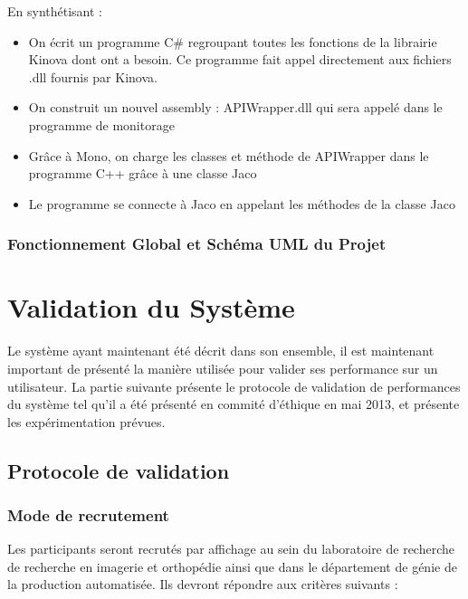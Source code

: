 \documentclass[letterpaper, twoside, 12pt, memoire, creativecommons, hyperref]{thETS}
\begin{document}
En synthétisant :
\begin{itemize}
 \item On écrit un programme C\# regroupant toutes les fonctions de la librairie Kinova dont ont a besoin. Ce programme fait appel directement aux fichiers .dll fournis par Kinova. 
 \item On construit un nouvel assembly : APIWrapper.dll qui sera appelé dans le programme de monitorage
 \item Grâce à Mono, on charge les classes et méthode de APIWrapper dans le programme C++ grâce à une classe Jaco
 \item Le programme se connecte à Jaco en appelant les méthodes de la classe Jaco
\end{itemize}



\subsubsection{Fonctionnement Global et Schéma UML du Projet}

\section{Validation du Système}

Le système ayant maintenant été décrit dans son ensemble, il est maintenant important de présenté la manière utilisée pour valider ses performance sur un utilisateur. La partie suivante présente le protocole de validation de performances du système tel qu'il a été présenté en commité d'éthique en mai 2013, et présente les expérimentation prévues.

\subsection{Protocole de validation}

\subsubsection{Mode de recrutement} 

Les participants seront recrutés par affichage au sein du laboratoire de recherche de recherche en imagerie et orthopédie ainsi que dans le département de génie de la production automatisée. Ils devront répondre aux critères suivants : 
\end{document}
